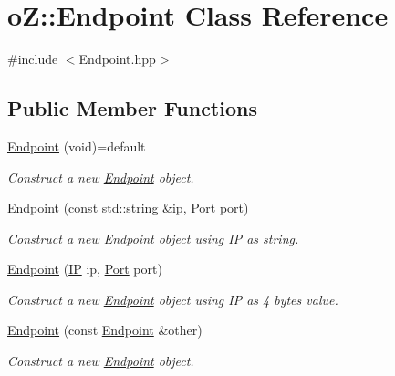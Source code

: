 \hypertarget{classo_z_1_1_endpoint}{}\section{oZ\+::Endpoint Class Reference}
\label{classo_z_1_1_endpoint}


{\ttfamily \#include $<$Endpoint.\+hpp$>$}

\subsection*{Public Member Functions}
\begin{DoxyCompactItemize}
\item 
\mbox{\hyperlink{classo_z_1_1_endpoint_aa0e46ff6f1b744e9173a97680e2e20a6}{Endpoint}} (void)=default
\begin{DoxyCompactList}\small\item\em Construct a new \mbox{\hyperlink{classo_z_1_1_endpoint}{Endpoint}} object. \end{DoxyCompactList}\item 
\mbox{\hyperlink{classo_z_1_1_endpoint_ac7c25299f3e5bc05a54e7906d17fbfd9}{Endpoint}} (const std\+::string \&ip, \mbox{\hyperlink{namespaceo_z_afeccb82d451972ba3b7d2a32b066b30b}{Port}} port)
\begin{DoxyCompactList}\small\item\em Construct a new \mbox{\hyperlink{classo_z_1_1_endpoint}{Endpoint}} object using IP as string. \end{DoxyCompactList}\item 
\mbox{\hyperlink{classo_z_1_1_endpoint_a7dd91554b61824eac5e0b015fa12f957}{Endpoint}} (\mbox{\hyperlink{namespaceo_z_ace55c2d0182a14ceea9649d0d0cf9c4a}{IP}} ip, \mbox{\hyperlink{namespaceo_z_afeccb82d451972ba3b7d2a32b066b30b}{Port}} port)
\begin{DoxyCompactList}\small\item\em Construct a new \mbox{\hyperlink{classo_z_1_1_endpoint}{Endpoint}} object using IP as 4 bytes value. \end{DoxyCompactList}\item 
\mbox{\hyperlink{classo_z_1_1_endpoint_a33f6c2eb724e0d60d988212bc6b66008}{Endpoint}} (const \mbox{\hyperlink{classo_z_1_1_endpoint}{Endpoint}} \&other)
\begin{DoxyCompactList}\small\item\em Construct a new \mbox{\hyperlink{classo_z_1_1_endpoint}{Endpoint}} object. \end{DoxyCompactList}\item 

\end{DoxyCompactItemize}
